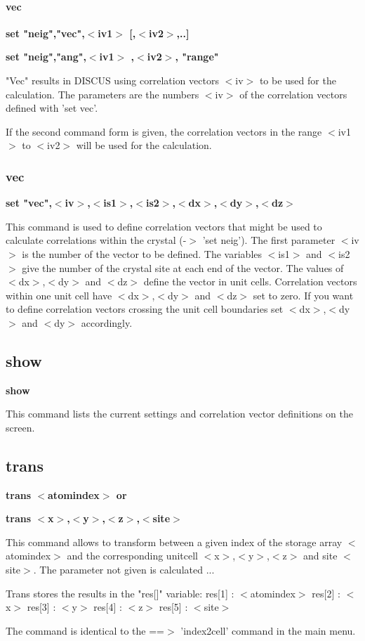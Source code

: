\paragraph*{vec}
{\bf set "neig","vec",$ <$iv1$> $ [,$ <$iv2$> $,..] \par }
{\bf set "neig","ang",$ <$iv1$> $ ,$ <$iv2$> $, "range" \par }
\par
\vspace{3pt}
"Vec" results in DISCUS using correlation vectors $ <$iv$> $ to be used 
for the calculation. The parameters are the numbers $ <$iv$> $ of the 
correlation vectors defined with 'set vec'. 
\par
If the second command form is given, the correlation vectors in the 
range $ <$iv1$> $ to $ <$iv2$> $ will be used for the calculation. 
\subsubsection{vec}
{\bf set "vec",$ <$iv$> $,$ <$is1$> $,$ <$is2$> $,$ <$dx$> $,$ <$dy$> $,$ <$dz$> $ \par }
\par
\vspace{3pt}
This command is used to define correlation vectors that might be used 
to calculate correlations within the crystal (-$> $ 'set neig'). The 
first parameter $ <$iv$> $ is the number of the vector to be defined. The 
variables $ <$is1$> $ and $ <$is2$> $ give the number of the crystal site at each 
end of the vector. The values of $ <$dx$> $,$ <$dy$> $ and $ <$dz$> $ define the vector 
in unit cells. Correlation vectors within one unit cell have $ <$dx$> $,$ <$dy$> $ 
and $ <$dz$> $ set to zero. If you want to define correlation vectors crossing 
the unit cell boundaries set $ <$dx$> $,$ <$dy$> $ and $ <$dy$> $ accordingly. 
\subsection*{show}
{\bf show \par }
\par
\vspace{3pt}
This command lists the current settings and correlation vector 
definitions on the screen. 
\subsection*{trans}
{\bf trans $ <$atomindex$> $ or \par }
{\bf trans $ <$x$> $,$ <$y$> $,$ <$z$> $,$ <$site$> $ \par }
\par
\vspace{3pt}
This command allows to transform between a given index of the 
storage array $ <$atomindex$> $ and the corresponding unitcell $ <$x$> $,$ <$y$> $,$ <$z$> $ 
and site $ <$site$> $. The parameter not given is calculated ... 
\par
Trans stores the results in the "res[]" variable: 
res[1] : $ <$atomindex$> $ 
res[2] : $ <$x$> $ 
res[3] : $ <$y$> $ 
res[4] : $ <$z$> $ 
res[5] : $ <$site$> $ 
\par
The command is identical to the ==$> $ 'index2cell' command in the 
main menu. 
